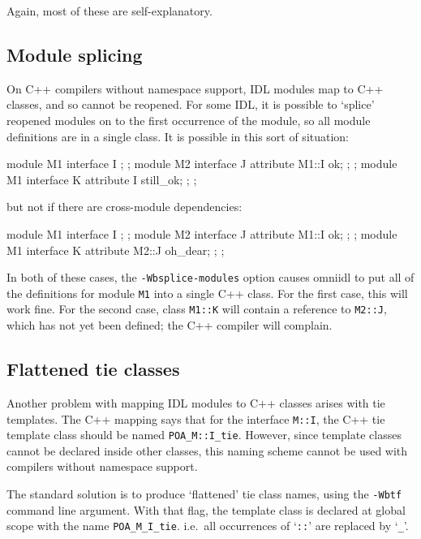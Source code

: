 \documentclass[11pt,twoside,a4paper]{book}
\newcommand{\type}[1]{\texttt{#1}}
\newcommand{\intf}[1]{\texttt{#1}}
\newcommand{\cmdline}[1]{\texttt{#1}}
\begin{document}
\noindent Again, most of these are self-explanatory.


\subsection{Module splicing}

On C++ compilers without namespace support, IDL modules map to C++
classes, and so cannot be reopened. For some IDL, it is possible to
`splice' reopened modules on to the first occurrence of the module, so
all module definitions are in a single class. It is possible in this
sort of situation:

\begin{idllisting}
module M1 {
  interface I {};
};
module M2 {
  interface J {
    attribute M1::I ok;
  };
};
module M1 {
  interface K {
    attribute I still_ok;
  };
};
\end{idllisting}

\noindent but not if there are cross-module dependencies:

\begin{idllisting}
module M1 {
  interface I {};
};
module M2 {
  interface J {
    attribute M1::I ok;
  };
};
module M1 {
  interface K {
    attribute M2::J oh_dear;
  };
};
\end{idllisting}

\noindent In both of these cases, the \cmdline{-Wbsplice-modules}
option causes omniidl to put all of the definitions for module
\intf{M1} into a single C++ class. For the first case, this will work
fine. For the second case, class \type{M1::K} will contain a reference
to \type{M2::J}, which has not yet been defined; the C++ compiler will
complain.


\subsection{Flattened tie classes}

Another problem with mapping IDL modules to C++ classes arises with
tie templates. The C++ mapping says that for the interface
\intf{M::I}, the C++ tie template class should be named
\type{POA\_M::I\_tie}. However, since template classes cannot be
declared inside other classes, this naming scheme cannot be used with
compilers without namespace support.

The standard solution is to produce `flattened' tie class names, using
the \cmdline{-Wbtf} command line argument. With that flag, the
template class is declared at global scope with the name
\type{POA\_M\_I\_tie}. i.e.\ all occurrences of `\type{::}' are
replaced by `\type{\_}'.
\end{document}
